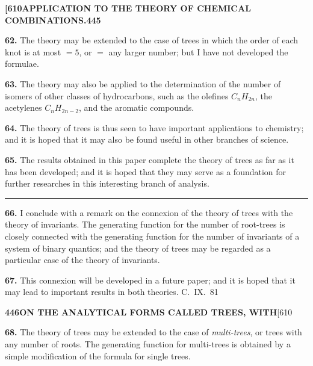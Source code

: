 \documentclass[11pt,a4paper]{article}
\begin{document}
{\newpage
\noindent\textbf{[610}\hspace{\fill}\textbf{APPLICATION TO THE THEORY OF CHEMICAL COMBINATIONS.}\hspace{\fill}\textbf{445}

\noindent\textbf{62.}
The theory may be extended to the case of trees in which the order of each knot is at most $=5$, or $=$ any larger number; but I have not developed the formulae.

\medskip
\noindent\textbf{63.}
The theory may also be applied to the determination of the number of isomers of other classes of hydrocarbons, such as the olefines $C_nH_{2n}$, the acetylenes $C_nH_{2n-2}$, and the aromatic compounds.

\medskip
\noindent\textbf{64.}
The theory of trees is thus seen to have important applications to chemistry; and it is hoped that it may also be found useful in other branches of science.

\medskip
\noindent\textbf{65.}
The results obtained in this paper complete the theory of trees as far as it has been developed; and it is hoped that they may serve as a foundation for further researches in this interesting branch of analysis.

\bigskip
\begin{center}
\rule{0.5\textwidth}{0.4pt}
\end{center}

\medskip
\noindent\textbf{66.}
I conclude with a remark on the connexion of the theory of trees with the theory of invariants. The generating function for the number of root-trees is closely connected with the generating function for the number of invariants of a system of binary quantics; and the theory of trees may be regarded as a particular case of the theory of invariants.

\medskip
\noindent\textbf{67.}
This connexion will be developed in a future paper; and it is hoped that it may lead to important results in both theories.
\hfill C.~IX.\ 81

\newpage
\noindent\textbf{446}\hspace{\fill}\textbf{ON THE ANALYTICAL FORMS CALLED TREES, WITH}\hspace{\fill}[610

\noindent\textbf{68.}
The theory of trees may be extended to the case of \textit{multi-trees}, or trees with any number of roots. The generating function for multi-trees is obtained by a simple modification of the formula for single trees.

}
\end{document}
